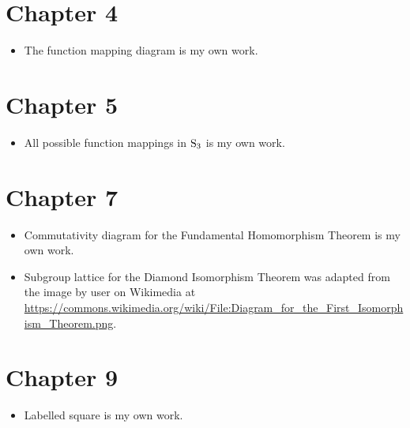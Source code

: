 \section*{Chapter 4}
\begin{itemize}
    \item The function mapping diagram is my own work.
\end{itemize}

\section*{Chapter 5}
\begin{itemize}
    \item All possible function mappings in $\mathrm{S}_{3}$ is my own work.
\end{itemize}

\section*{Chapter 7}
\begin{itemize}
    \item Commutativity diagram for the Fundamental Homomorphism Theorem is my own work.
    \item Subgroup lattice for the Diamond Isomorphism Theorem was adapted from the image by user  on Wikimedia at \url{https://commons.wikimedia.org/wiki/File:Diagram_for_the_First_Isomorphism_Theorem.png}.
\end{itemize}

\section*{Chapter 9}
\begin{itemize}
    \item Labelled square is my own work.
\end{itemize}

\printbibliography[heading=bibintoc, title={References and Bibliography}]



